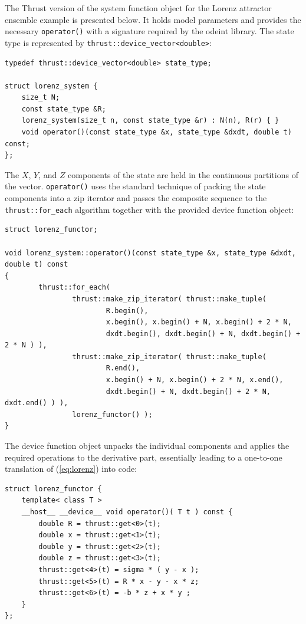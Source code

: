 \documentclass[final]{siamltex}
\newcommand{\code}[1]{\lstinline|#1|}
\newcommand{\eqref}[1]{(\ref{#1})}
\begin{document}
The Thrust version of the system function object for the Lorenz attractor ensemble
example is presented below. It holds model parameters and provides the necessary
\code{operator()} with a signature required by the odeint library. The state
type is represented by \code{thrust::device_vector<double>}:
\begin{lstlisting}
typedef thrust::device_vector<double> state_type;

struct lorenz_system {
    size_t N;
    const state_type &R;
    lorenz_system(size_t n, const state_type &r) : N(n), R(r) { }
    void operator()(const state_type &x, state_type &dxdt, double t) const;
};
\end{lstlisting}
The $X$, $Y$, and $Z$ components of the state are held in the continuous
partitions of the vector.  \code{operator()} uses the standard technique of
packing the state components into a zip iterator and passes the composite
sequence to the \code{thrust::for_each} algorithm together with the provided
device function object:
\begin{lstlisting}[firstnumber=12]
struct lorenz_functor;

void lorenz_system::operator()(const state_type &x, state_type &dxdt, double t) const
{
        thrust::for_each(
                thrust::make_zip_iterator( thrust::make_tuple(
                        R.begin(),
                        x.begin(), x.begin() + N, x.begin() + 2 * N,
                        dxdt.begin(), dxdt.begin() + N, dxdt.begin() + 2 * N ) ),
                thrust::make_zip_iterator( thrust::make_tuple(
                        R.end(),
                        x.begin() + N, x.begin() + 2 * N, x.end(),
                        dxdt.begin() + N, dxdt.begin() + 2 * N, dxdt.end() ) ),
                lorenz_functor() );
}
\end{lstlisting}
The device function object unpacks the individual components and applies the required
operations to the derivative part, essentially leading to a one-to-one
translation of \eqref{eq:lorenz} into code:
\begin{lstlisting}[firstnumber=last]
struct lorenz_functor {
    template< class T >
    __host__ __device__ void operator()( T t ) const {
        double R = thrust::get<0>(t);
        double x = thrust::get<1>(t);
        double y = thrust::get<2>(t);
        double z = thrust::get<3>(t);
        thrust::get<4>(t) = sigma * ( y - x );
        thrust::get<5>(t) = R * x - y - x * z;
        thrust::get<6>(t) = -b * z + x * y ;
    }
};
\end{lstlisting}
\end{document}
